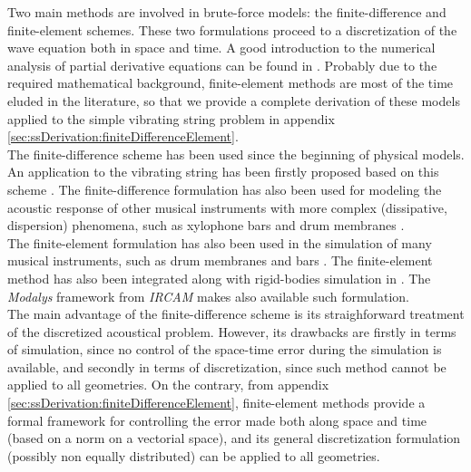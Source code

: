 {{					
					\label{subsubsubsubsec:CM_SS_Physics_Wave_FD}

Two main methods are involved in brute-force models: the finite-difference and finite-element schemes. These two formulations proceed to a discretization of the wave equation both in space and time. A good introduction to the numerical analysis of partial derivative equations can be found in . Probably due to the required mathematical background, finite-element methods are most of the time eluded in the literature, so that we provide a complete derivation of these models applied to the simple vibrating string problem in appendix \ref{sec:ssDerivation:finiteDifferenceElement}.\\

The finite-difference scheme has been used since the beginning of physical models. An application to the vibrating string has been firstly proposed based on this scheme . The finite-difference formulation has also been used for modeling the acoustic response of other musical instruments with more complex (dissipative, dispersion) phenomena, such as xylophone bars  and drum membranes .\\

The finite-element formulation has also been used in the simulation of many musical instruments, such as drum membranes  and bars . The finite-element method has also been integrated along with rigid-bodies simulation in . The \emph{Modalys} framework  from \emph{IRCAM}  makes also available such formulation.\\

The main advantage of the finite-difference scheme is its straighforward treatment of the discretized acoustical problem. However, its drawbacks are firstly in terms of simulation, since no control of the space-time error during the simulation is available, and secondly in terms of discretization, since such method cannot be applied to all geometries. On the contrary, from appendix \ref{sec:ssDerivation:finiteDifferenceElement}, finite-element methods provide a formal framework for controlling the error made both along space and time (based on a norm on a vectorial space), and its general discretization formulation (possibly non equally distributed) can be applied to all geometries.

}}
